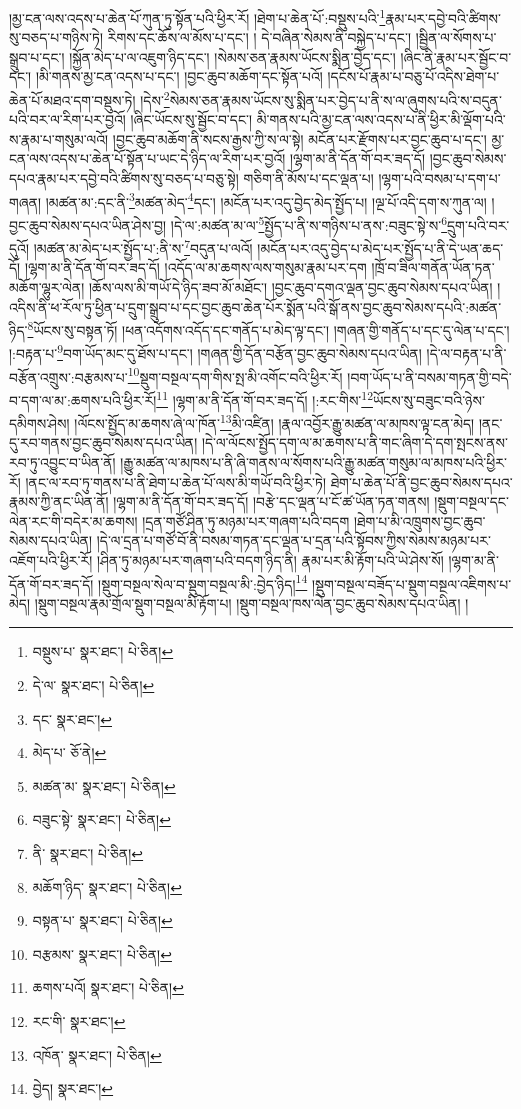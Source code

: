 །མྱ་ངན་ལས་འདས་པ་ཆེན་པོ་ཀུན་ཏུ་སྟོན་པའི་ཕྱིར་རོ། །ཐེག་པ་ཆེན་པོ་:བསྡུས་པའི་\footnote{བསྡུས་པ་  སྣར་ཐང་།  པེ་ཅིན། }རྣམ་པར་དབྱེ་བའི་ཚིགས་སུ་བཅད་པ་གཉིས་ཏེ། རིགས་དང་ཆོས་ལ་མོས་པ་དང་། །
དེ་བཞིན་སེམས་ནི་བསྐྱེད་པ་དང་། །སྦྱིན་ལ་སོགས་པ་སྒྲུབ་པ་དང་། །སྐྱོན་མེད་པ་ལ་འཇུག་ཉིད་དང་། །སེམས་ཅན་རྣམས་ཡོངས་སྨིན་བྱེད་དང་། །ཞིང་ནི་རྣམ་པར་སྦྱོང་བ་དང་། །མི་གནས་མྱ་ངན་འདས་པ་དང་། །བྱང་ཆུབ་མཆོག་དང་སྟོན་པའོ། །དངོས་པོ་རྣམ་པ་བཅུ་པོ་འདིས་ཐེག་པ་ཆེན་པོ་མཐའ་དག་བསྡུས་ཏེ། །དེས་\footnote{དེ་ལ་  སྣར་ཐང་།  པེ་ཅིན། }སེམས་ཅན་རྣམས་ཡོངས་སུ་སྨིན་པར་བྱེད་པ་ནི་ས་ལ་ཞུགས་པའི་ས་བདུན་པའི་བར་ལ་རིག་པར་བྱའོ། །ཞིང་ཡོངས་སུ་སྦྱོང་བ་དང་། མི་གནས་པའི་མྱ་ངན་ལས་འདས་པ་ནི་ཕྱིར་མི་ལྡོག་པའི་ས་རྣམ་པ་གསུམ་ལའོ། །བྱང་ཆུབ་མཆོག་ནི་སངས་རྒྱས་ཀྱི་ས་ལ་སྟེ། མངོན་པར་རྫོགས་པར་བྱང་ཆུབ་པ་དང་། མྱ་ངན་ལས་འདས་པ་ཆེན་པོ་སྟོན་པ་ཡང་དེ་ཉིད་ལ་རིག་པར་བྱའོ། །ལྷག་མ་ནི་དོན་གོ་བར་ཟད་དོ། །བྱང་ཆུབ་སེམས་དཔའ་རྣམ་པར་དབྱེ་བའི་ཚིགས་སུ་བཅད་པ་བཅུ་སྟེ། གཅིག་ནི་མོས་པ་དང་ལྡན་པ། །ལྷག་པའི་བསམ་པ་དག་པ་གཞན། །མཚན་མ་:དང་ནི་\footnote{དང་  སྣར་ཐང་། }མཚན་མེད་\footnote{མེད་པ་  ཅོ་ནེ། }དང་། །མངོན་པར་འདུ་བྱེད་མེད་སྤྱོད་པ། །ལྔ་པོ་འདི་དག་ས་ཀུན་ལ། །བྱང་ཆུབ་སེམས་དཔའ་ཡིན་ཤེས་བྱ། །དེ་ལ་:མཚན་མ་ལ་\footnote{མཚན་མ་  སྣར་ཐང་།  པེ་ཅིན། }སྤྱོད་པ་ནི་ས་གཉིས་པ་ནས་:བཟུང་སྟེ་ས་\footnote{བཟུང་སྟེ་  སྣར་ཐང་།  པེ་ཅིན། }དྲུག་པའི་བར་དུའོ། །མཚན་མ་མེད་པར་སྤྱོད་པ་:ནི་ས་\footnote{ནི་  སྣར་ཐང་།  པེ་ཅིན། }བདུན་པ་ལའོ། །མངོན་པར་འདུ་བྱེད་པ་མེད་པར་སྤྱོད་པ་ནི་དེ་ཡན་ཆད་དོ། །ལྷག་མ་ནི་དོན་གོ་བར་ཟད་དོ། །འདོད་ལ་མ་ཆགས་ལས་གསུམ་རྣམ་པར་དག །ཁྲོ་བ་ཟིལ་གནོན་ཡོན་ཏན་མཆོག་ལྷུར་ལེན། །ཆོས་ལས་མི་གཡོ་དེ་ཉིད་ཟབ་མོ་མཐོང་། །བྱང་ཆུབ་དགའ་ལྡན་བྱང་ཆུབ་སེམས་དཔའ་ཡིན། །འདིས་ནི་ཕ་རོལ་ཏུ་ཕྱིན་པ་དྲུག་སྒྲུབ་པ་དང་བྱང་ཆུབ་ཆེན་པོར་སྨོན་པའི་སྒོ་ནས་བྱང་ཆུབ་སེམས་དཔའི་:མཚན་ཉིད་\footnote{མཆོག་ཉིད་  སྣར་ཐང་།  པེ་ཅིན། }ཡོངས་སུ་བསྟན་ཏོ། །ཕན་འདོགས་འདོད་དང་གནོད་པ་མེད་ལྟ་དང་། །གཞན་གྱི་གནོད་པ་དང་དུ་ལེན་པ་དང་། །:བརྟན་པ་\footnote{བསྟན་པ་  སྣར་ཐང་།  པེ་ཅིན། }བག་ཡོད་མང་དུ་ཐོས་པ་དང་། །གཞན་གྱི་དོན་བརྩོན་བྱང་ཆུབ་སེམས་དཔའ་ཡིན། །དེ་ལ་བརྟན་པ་ནི་བརྩོན་འགྲུས་:བརྩམས་པ་\footnote{བརྩམས་  སྣར་ཐང་།  པེ་ཅིན། }སྡུག་བསྔལ་དག་གིས་སྤ་མི་འགོང་བའི་ཕྱིར་རོ། །བག་ཡོད་པ་ནི་བསམ་གཏན་གྱི་བདེ་བ་དག་ལ་མ་:ཆགས་པའི་ཕྱིར་རོ།\footnote{ཆགས་པའོ།  སྣར་ཐང་།  པེ་ཅིན། } །ལྷག་མ་ནི་དོན་གོ་བར་ཟད་དོ། །:རང་གིས་\footnote{རང་གི་  སྣར་ཐང་། }ཡོངས་སུ་བཟུང་བའི་ཉེས་དམིགས་ཤེས། །ལོངས་སྤྱོད་མ་ཆགས་ཞེ་ལ་ཁོན་\footnote{འཁོན་  སྣར་ཐང་།  པེ་ཅིན། }མི་འཛིན། །རྣལ་འབྱོར་རྒྱུ་མཚན་ལ་མཁས་ལྟ་ངན་མེད། །ནང་དུ་རབ་གནས་བྱང་ཆུབ་སེམས་དཔའ་ཡིན། །དེ་ལ་ལོངས་སྤྱོད་དག་ལ་མ་ཆགས་པ་ནི་གང་ཞིག་དེ་དག་སྤངས་ནས་རབ་ཏུ་འབྱུང་བ་ཡིན་ནོ། །རྒྱུ་མཚན་ལ་མཁས་པ་ནི་ཞི་གནས་ལ་སོགས་པའི་རྒྱུ་མཚན་གསུམ་ལ་མཁས་པའི་ཕྱིར་རོ། །ནང་ལ་རབ་ཏུ་གནས་པ་ནི་ཐེག་པ་ཆེན་པོ་ལས་མི་གཡོ་བའི་ཕྱིར་ཏེ། ཐེག་པ་ཆེན་པོ་ནི་བྱང་ཆུབ་སེམས་དཔའ་རྣམས་ཀྱི་ནང་ཡིན་ནོ། །ལྷག་མ་ནི་དོན་གོ་བར་ཟད་དོ། །བརྩེ་དང་ལྡན་པ་ངོ་ཚ་ཡོན་ཏན་གནས། །སྡུག་བསྔལ་དང་ལེན་རང་གི་བདེར་མ་ཆགས། །དྲན་གཙོ་ཤིན་ཏུ་མཉམ་པར་གཞག་པའི་བདག །ཐེག་པ་མི་འཁྲུགས་བྱང་ཆུབ་སེམས་དཔའ་ཡིན། །དེ་ལ་དྲན་པ་གཙོ་བོ་ནི་བསམ་གཏན་དང་ལྡན་པ་དྲན་པའི་སྟོབས་ཀྱིས་སེམས་མཉམ་པར་འཇོག་པའི་ཕྱིར་རོ། །ཤིན་ཏུ་མཉམ་པར་གཞག་པའི་བདག་ཉིད་ནི། རྣམ་པར་མི་རྟོག་པའི་ཡེ་ཤེས་སོ། །ལྷག་མ་ནི་དོན་གོ་བར་ཟད་དོ། །སྡུག་བསྔལ་སེལ་བ་སྡུག་བསྔལ་མི་:བྱེད་ཉིད།\footnote{བྱེད།  སྣར་ཐང་། } །སྡུག་བསྔལ་བཟོད་པ་སྡུག་བསྔལ་འཇིགས་པ་མེད། །སྡུག་བསྔལ་རྣམ་གྲོལ་སྡུག་བསྔལ་མི་རྟོག་པ། །སྡུག་བསྔལ་ཁས་ལེན་བྱང་ཆུབ་སེམས་དཔའ་ཡིན། །
